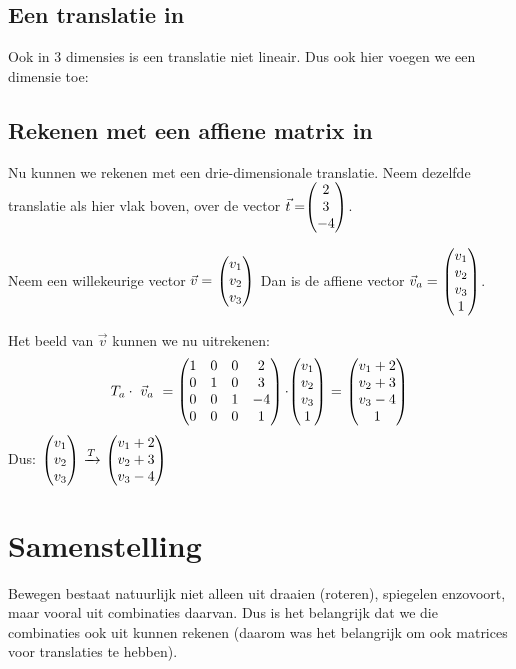 \subsection{Een translatie in \RD}
Ook in $3$ dimensies is een translatie niet lineair. Dus ook hier voegen we een dimensie toe:
\vspace{-5mm}

\subsection{Rekenen met een affiene  matrix in \RD}
Nu kunnen we rekenen met een drie-dimensionale translatie. Neem dezelfde translatie als hier vlak boven, over de vector $\vec{t}= \vecdrie{2}{3}{-4} $. 

Neem een willekeurige vector $\vec{v} =\ \vecdriesnel{v} $ Dan is de affiene vector $\vec{v}_a =\  \vecvier{v_1}{v_2}{v_3}{1} $.

Het beeld van $\vec{v} $ kunnen we nu uitrekenen: 
\[ 
    T_a \cdot\ \vec{v}_a \ = \matvier{1&0&0&2}{0&1&0&3}{0&0&1&-4}{0&0&0&1} \cdot \vecvier{v_1}{v_2}{v_3}{1} \ 
    =\ \vecvier{v_1 + 2}{v_2 + 3}{v_3 - 4}{1}
\]
Dus: \quad \quad $\vecdriesnel{v} \ \xrightarrow{T} \ \vecdrie{v_1+2}{v_2+3}{v_3-4} $ 

\section{Samenstelling}		
Bewegen bestaat natuurlijk niet alleen uit draaien (roteren), spiegelen enzovoort, maar vooral uit combinaties daarvan. Dus is het belangrijk dat we die combinaties ook uit kunnen rekenen (daarom was het belangrijk om ook matrices voor translaties te hebben). 

